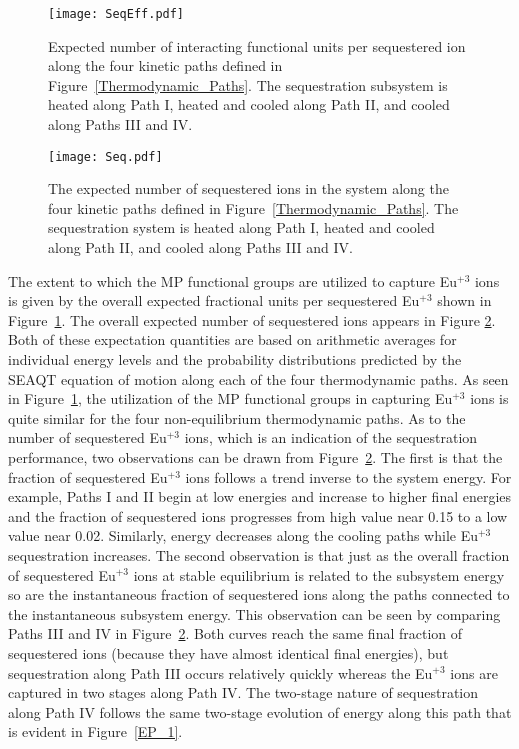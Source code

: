 \documentclass[
journal=jcisd8, %
manuscript=article,
layout=twocolumn   %
]{achemso}
\begin{document}
\begin{figure}[ht!]
	\begin{center}
		\texttt{[image: SeqEff.pdf]}
  \hspace*{\fill} 
		\caption{Expected number of interacting functional units per sequestered ion along the four kinetic paths defined in Figure~\ref{Thermodynamic_Paths}. The sequestration subsystem is heated along Path I, heated and cooled along Path II, and cooled along Paths III and IV. }
		\label{Num_Seq}
	\end{center}
\end{figure}

\begin{figure}[ht!]
	\begin{center}
		\texttt{[image: Seq.pdf]}
  \hspace*{\fill} 
		\caption{The expected number of sequestered ions in the system along the four kinetic paths defined in Figure~\ref{Thermodynamic_Paths}. The sequestration system is heated along Path I, heated and cooled along Path II, and cooled along Paths III and IV. }
		\label{SeqEff}
	\end{center}
\end{figure}

The extent to which the MP functional groups are utilized to capture Eu$^{+3}$ ions is given by the overall expected fractional units per sequestered Eu$^{+3}$ shown in Figure~\ref{Num_Seq}. The overall expected number of sequestered ions appears in Figure \ref{SeqEff}.  Both of these expectation quantities are based on arithmetic averages for individual energy levels and the probability distributions predicted by the SEAQT equation of motion along each of the four thermodynamic paths. As seen in Figure~\ref{Num_Seq}, the utilization of the MP functional groups in capturing Eu$^{+3}$ ions is quite similar for the four non-equilibrium thermodynamic paths.  As to the number of sequestered Eu$^{+3}$ ions, which is an indication of the sequestration performance, two observations can be drawn from Figure~\ref{SeqEff}. The first is that the fraction of sequestered Eu$^{+3}$ ions  follows a trend inverse to the system energy.  For example, Paths I and II begin at low energies and increase to higher final energies and the fraction of sequestered ions progresses from high value near 0.15 to a low value near 0.02.  Similarly,  energy decreases along the cooling paths while Eu$^{+3}$ sequestration increases. The second observation is that just as the overall fraction of sequestered Eu$^{+3}$ ions at stable equilibrium is related to the subsystem energy so are the instantaneous fraction of sequestered ions along the paths connected to the instantaneous subsystem energy.  This observation can be seen by comparing Paths III and IV in Figure~\ref{SeqEff}. Both curves reach the same final fraction of sequestered ions (because they have almost identical final energies), but sequestration along Path III occurs relatively quickly whereas the Eu$^{+3}$ ions are captured in two stages along Path IV.  The two-stage nature of sequestration along Path IV follows the same two-stage evolution of energy  along this path that is evident in Figure~\ref{EP_1}. 
\end{document}
